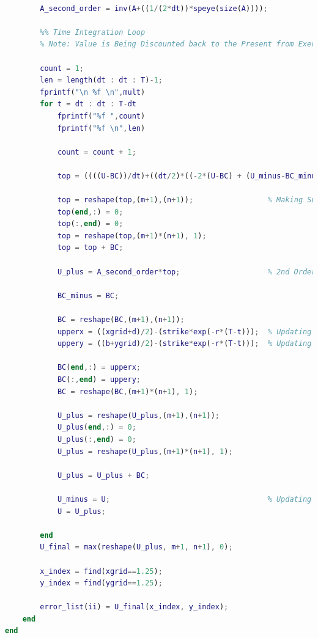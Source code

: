 \documentclass[12pt,letterpaper]{article}
\begin{document}
\begin{lstlisting}[language = Matlab]
        %% Calculate Inverse of Matrix Needed for 2nd Order Implicit Time Scheme
        
        A_second_order = inv(A+((1/(2*dt))*speye(size(A))));
        
        %% Time Integration Loop
        % Note: Value is Being Discounted back to the Present from Exersize Date
        
        count = 1;
        len = length(dt : dt : T)-1;
        fprintf("\n %f \n",mult)
        for t = dt : dt : T-dt 
            fprintf("%f ",count)
            fprintf("%f \n",len)
        
            count = count + 1;
        
            top = ((((U-BC))/dt)+((dt/2)*((-2*(U-BC) + (U_minus-BC_minus))/(dt*dt))) + BC); % Updating Implicit Scheme Vector
        
            top = reshape(top,(m+1),(n+1));                 % Making Sure Far-Field Boundaries Have Correct Value in Case of Rounding Error
            top(end,:) = 0;
            top(:,end) = 0;
            top = reshape(top,(m+1)*(n+1), 1);
            top = top + BC;
        
            U_plus = A_second_order*top;                    % 2nd Order Implicit Scheme for Next Time Step
        
            BC_minus = BC;
        
            BC = reshape(BC,(m+1),(n+1));
            upperx = ((xgrid+d)/2)-(strike*exp(-r*(T-t)));  % Updating Far-Field Boundary Conditions for X
            uppery = ((b+ygrid)/2)-(strike*exp(-r*(T-t)));  % Updating Far-Field Boundary Conditions for Y
        
            BC(end,:) = upperx;
            BC(:,end) = uppery;
            BC = reshape(BC,(m+1)*(n+1), 1);
        
            U_plus = reshape(U_plus,(m+1),(n+1));
            U_plus(end,:) = 0;
            U_plus(:,end) = 0;
            U_plus = reshape(U_plus,(m+1)*(n+1), 1);
            
            U_plus = U_plus + BC;
        
            U_minus = U;                                    % Updating U_minus and U for Next Time Step
            U = U_plus;
    
        end
        U_final = max(reshape(U_plus, m+1, n+1), 0);                           % Option Value doesn't go below zero

        x_index = find(xgrid==1.25);
        y_index = find(ygrid==1.25);

        error_list(ii) = U_final(x_index, y_index);
    end
end
\end{lstlisting}
\end{document}
